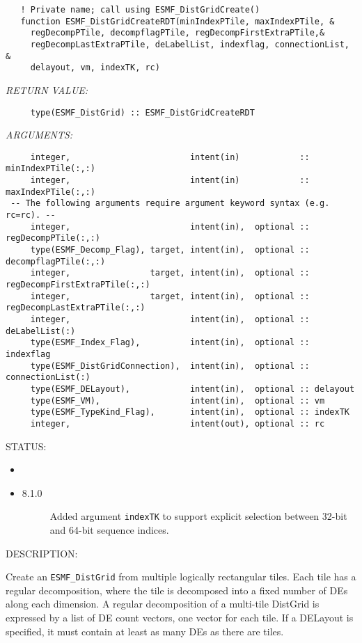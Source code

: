 
\begin{verbatim}   ! Private name; call using ESMF_DistGridCreate()
   function ESMF_DistGridCreateRDT(minIndexPTile, maxIndexPTile, &
     regDecompPTile, decompflagPTile, regDecompFirstExtraPTile,&
     regDecompLastExtraPTile, deLabelList, indexflag, connectionList, &
     delayout, vm, indexTK, rc)
           \end{verbatim}{\em RETURN VALUE:}
\begin{verbatim}     type(ESMF_DistGrid) :: ESMF_DistGridCreateRDT\end{verbatim}{\em ARGUMENTS:}
\begin{verbatim}     integer,                        intent(in)            :: minIndexPTile(:,:)
     integer,                        intent(in)            :: maxIndexPTile(:,:)
 -- The following arguments require argument keyword syntax (e.g. rc=rc). --
     integer,                        intent(in),  optional :: regDecompPTile(:,:)
     type(ESMF_Decomp_Flag), target, intent(in),  optional :: decompflagPTile(:,:)
     integer,                target, intent(in),  optional :: regDecompFirstExtraPTile(:,:)
     integer,                target, intent(in),  optional :: regDecompLastExtraPTile(:,:)
     integer,                        intent(in),  optional :: deLabelList(:)
     type(ESMF_Index_Flag),          intent(in),  optional :: indexflag
     type(ESMF_DistGridConnection),  intent(in),  optional :: connectionList(:)
     type(ESMF_DELayout),            intent(in),  optional :: delayout
     type(ESMF_VM),                  intent(in),  optional :: vm
     type(ESMF_TypeKind_Flag),       intent(in),  optional :: indexTK
     integer,                        intent(out), optional :: rc\end{verbatim}
{\sf STATUS:}
   \begin{itemize}
   \item{}
   \item{}
   \begin{description}
   \item[8.1.0] Added argument {\tt indexTK} to support explicit selection
                between 32-bit and 64-bit sequence indices.
   \end{description}
   \end{itemize}
  
{\sf DESCRIPTION:\\ }


       Create an {\tt ESMF\_DistGrid} from multiple logically rectangular tiles. 
       Each tile has a regular decomposition, where the tile is decomposed
       into a fixed number of DEs along each dimension. A regular decomposition
       of a multi-tile DistGrid is expressed by a list of DE count vectors, one
       vector for each tile. If a DELayout is specified, it must contain at least
       as many DEs as there are tiles.
  
